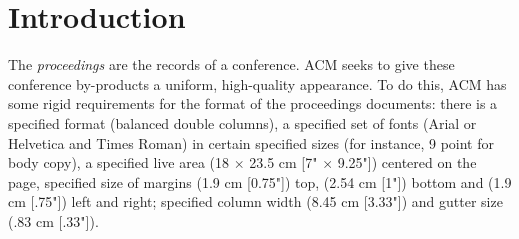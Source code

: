 \documentclass{edm_template}
\begin{document}
\date{30 July 1999}

\maketitle
\begin{abstract}
This paper provides a sample of a \LaTeX\ document which conforms to
the formatting guidelines for ACM SIG Proceedings.
It complements the document \textit{Author's Guide to Preparing
ACM SIG Proceedings Using \LaTeX$2_\epsilon$\ and Bib\TeX}. This
source file has been written with the intention of being
compiled under \LaTeX$2_\epsilon$\ and BibTeX.

The developers have tried to include every imaginable sort
of ``bells and whistles", such as a subtitle, footnotes on
title, subtitle and authors, as well as in the text, and
every optional component (e.g. Acknowledgments, Additional
Authors, Appendices), not to mention examples of
equations, theorems, tables and figures.

To make best use of this sample document, run it through \LaTeX\
and BibTeX, and compare this source code with the printed
output produced by the dvi file.
\end{abstract}

%


\section{Introduction}
The \textit{proceedings} are the records of a conference.
ACM seeks to give these conference by-products a uniform,
high-quality appearance.  To do this, ACM has some rigid
requirements for the format of the proceedings documents: there
is a specified format (balanced  double columns), a specified
set of fonts (Arial or Helvetica and Times Roman) in
certain specified sizes (for instance, 9 point for body copy),
a specified live area (18 $\times$ 23.5 cm [7" $\times$ 9.25"]) centered on
the page, specified size of margins (1.9 cm [0.75"]) top, (2.54 cm [1"]) bottom
and (1.9 cm [.75"]) left and right; specified column width
(8.45 cm [3.33"]) and gutter size (.83 cm [.33"]).
\end{document}
